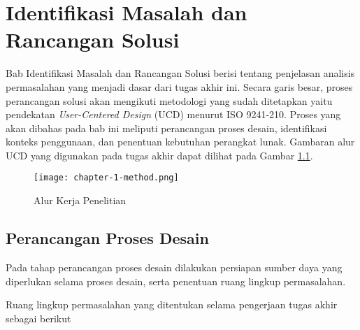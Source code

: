 \newcommand{\ccnormspacing}{\baselineskip=12pt}
\newcommand{\ccnormspacingcenter}{\centering\arraybackslash\ccnormspacing}


\chapter{Identifikasi Masalah dan Rancangan Solusi}


Bab Identifikasi Masalah dan Rancangan Solusi berisi tentang penjelasan analisis permasalahan yang menjadi dasar dari tugas akhir ini. Secara garis besar, proses perancangan solusi akan mengikuti metodologi yang sudah ditetapkan yaitu pendekatan \textit{User-Centered Design} (UCD) menurut ISO 9241-210. Proses yang akan dibahas pada bab ini meliputi perancangan proses desain, identifikasi konteks penggunaan, dan penentuan kebutuhan perangkat lunak. Gambaran alur UCD yang digunakan pada tugas akhir dapat dilihat pada Gambar \ref{fig:diagram_alur_kerja}.

\begin{figure}[h]
  \centering
  \texttt{[image: chapter-1-method.png]}
  \caption{Alur Kerja Penelitian}
  \label{fig:diagram_alur_kerja}
\end{figure}

\section{Perancangan Proses Desain}
\label{sec:perancangan_proses_desain}

Pada tahap perancangan proses desain dilakukan persiapan sumber daya yang diperlukan selama proses desain, serta penentuan ruang lingkup permasalahan.


Ruang lingkup permasalahan yang ditentukan selama pengerjaan tugas akhir sebagai berikut

